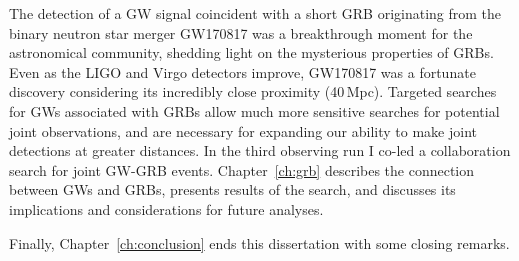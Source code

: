 The detection of a \ac{GW} signal coincident with a short \ac{GRB} originating from the binary neutron star merger GW170817 was a breakthrough moment for the astronomical community, shedding light on the mysterious properties of \acp{GRB}.
Even as the LIGO and Virgo detectors improve, GW170817 was a fortunate discovery considering its incredibly close proximity (40\,Mpc).
Targeted searches for \acp{GW} associated with \acp{GRB} allow much more sensitive searches for potential joint observations, and are necessary for expanding our ability to make joint detections at greater distances.
In the third observing run I co-led a collaboration search for joint GW-GRB events.
Chapter~\ref{ch:grb} describes the connection between \acp{GW} and \acp{GRB}, presents results of the search, and discusses its implications and considerations for future analyses.

Finally, Chapter~\ref{ch:conclusion} ends this dissertation with some closing remarks.
